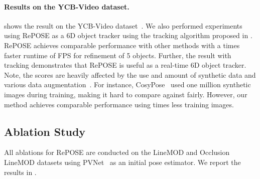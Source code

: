 \documentclass[10pt,twocolumn,letterpaper]{article}
\begin{document}
\paragraph{Results on the YCB-Video dataset.}
 shows the result on the YCB-Video dataset~\cite{xiang2018posecnn}. We also performed experiments using RePOSE as a 6D object tracker using the tracking algorithm proposed in \cite{li2018deepim}. RePOSE achieves comparable performance with other methods with a  times faster runtime of  FPS for refinement of 5 objects. Further, the result with tracking demonstrates that RePOSE is useful as a real-time 6D object tracker. Note, the scores are heavily affected by the use and amount of synthetic data and various data augmentation~\cite{labbe2020}. For instance, CosyPose~\cite{labbe2020} used one million synthetic images during training, making it hard to compare against fairly. However, our method achieves comparable performance using  times less training images.

\subsection{Ablation Study}
All ablations for RePOSE are conducted on the LineMOD and Occlusion LineMOD datasets using PVNet~\cite{peng2019pvnet} as an initial pose estimator. We report the results in .
\end{document}
